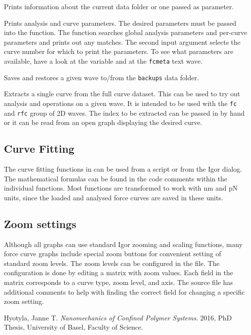 \documentclass[12pt,a4paper]{article}
\begin{document}
\begin{description}[style=nextline]

\item[PrintInfo, PrintInfoDF]
Prints information about the current data folder or one passed as parameter.

\item[PrintParams]
Prints analysis and curve parameters. The desired parameters must be passed into the function. The function searches global analysis parameters and per-curve parameters and prints out any matches. The second input argument selects the curve number for which to print the parameters.
To see what parameters are available, have a look at the  variable and at the \texttt{fcmeta} text wave.

\item[SaveBackupWave, RestoreBackupWave]
Saves and restores a given wave to/from the \texttt{backups} data folder.

\item[MakeTempCurve]
Extracts a single curve from the full curve dataset. This can be used to try out analysis and operations on a given wave. It is intended to be used with the \texttt{fc} and \texttt{rfc} group of 2D waves.
The index to be extracted can be passed in by hand or it can be read from an open graph displaying the desired curve.

\end{description}

\subsection{Curve Fitting}
The curve fitting functions in  can be used from a script or from the Igor  dialog. The mathematical formulas can be found in the code comments within the individual functions.
Most functions are transformed to work with \si{nm} and \si{pN} units, since the loaded and analysed force curves are saved in these units.


\subsection{Zoom settings}
\label{sec:afmsoftware-zoom}
Although all graphs can use standard Igor zooming and scaling functions, many force curve graphs include special zoom buttons for convenient setting of standard zoom levels.
The zoom levels can be configured in the  file.
The configuration is done by editing a matrix with zoom values. Each field in the matrix corresponds to a curve type, zoom level, and axis.
The source file has additional comments to help with finding the correct field for changing a specific zoom setting.





\begin{thebibliography}{9}

    Hyotyla, Janne T.
    \emph{Nanomechanics of Confined Polymer Systems}.
    2016, {PhD} Thesis, University of Basel, Faculty of Science.

\end{thebibliography}
\end{document}
